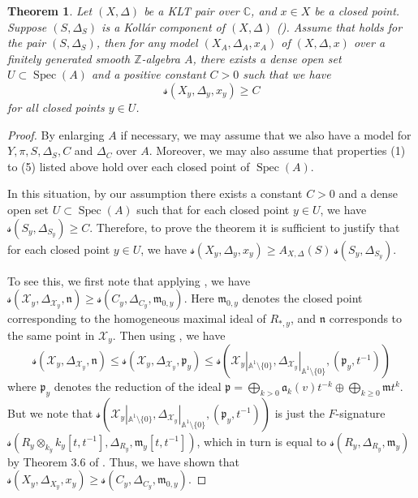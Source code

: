\documentclass[11pt,reqno]{amsart}
\newcommand{\A}{\mathbb{A}}
\newcommand{\C}{\mathbb{C}}
\newcommand{\Z}{\mathbb{Z}}
\newcommand{\cX}{\mathcal{X}}
\newcommand{\fa}{\mathfrak{a}}
\newcommand{\fm}{\mathfrak{m}}
\newcommand{\fn}{\mathfrak{n}}
\DeclareMathOperator{\Spec}{Spec}
\numberwithin{equation}{section}
\newtheorem{thm}[prop] {Theorem}
\theoremstyle{definition}
\newcommand{\s}{\mathscr{s}}
\begin{document}
\begin{thm} \label{thm:localtoglobalreduction}
  Let $(X, \Delta)$ be a KLT pair over $\C$, and $x \in X$ be a closed point. Suppose $(S, \Delta_S)$ is a Koll\'ar component of $(X, \Delta)$ (). Assume that  holds for the pair $(S, \Delta_S)$, then for any model $(X_A, \Delta_A, x_A)$ of $(X, \Delta, x)$ over a finitely generated smooth $\Z$-algebra $A$, there exists a dense open set $U \subset \Spec(A)$ and a positive constant $C>0$ such that we have
  \[ \s(X_y, \Delta_y, x_y) \geq C  \]
  for all closed points $y \in U$.
  \end{thm}
\begin{proof}
        By enlarging $A$ if necessary, we may assume that we also have a model for $Y, \pi, S, \Delta_S, C$ and $\Delta_C$ over $A$. Moreover, we may also assume that properties (1) to (5) listed above hold over each closed point of $\Spec(A).$

        In this situation, by our assumption there exists a constant $C>0$ and a dense open set $U \subset \Spec(A)$ such that for each closed point $y \in U$, we have
        $\s(S_y, \Delta_{S_y}) \geq C$. Therefore, to prove the theorem it is sufficient to justify that for each closed point $y \in U$, we have $\s(X_y,\Delta_y, x_y) \geq  A_{X, \Delta}(S)\ \s(S_y, \Delta_{S_y}) $.

        To see this, we first note that applying \cite[Corollary 1.2]{TaylorAdjunctionforFsig}, we have $\s(\cX_y, \Delta_{\cX_y}, \fn) \geq \s(C_y, \Delta_{C_y}, \fm_{0,y})$. Here $\fm_{0,y}$ denotes the closed point corresponding to the homogeneous maximal ideal of $R_{*, y}$, and $\fn$ corresponds to the same point in $\cX_y$. Then using \cite[Theorem 4.9]{PolstraTuckerCombinedApproach}, we have
        \[ \s(\cX_y, \Delta_{\cX_y}, \fn) \leq \s(\cX_y, \Delta_{\cX_y}, \mathfrak{p}_y) \leq \s(\cX_y|_{\A^1 \setminus \{0\}}, \Delta_{\cX_y}|_{\A^1 \setminus \{0\}}, (\mathfrak{p}_y, t^{-1}))\]
        where $\mathfrak{p}_y$ denotes the reduction of the ideal $\mathfrak{p} = \bigoplus_{k>0} \fa_k (v) t^{-k} \oplus \bigoplus _{k \geq 0} \fm t^{k} $. But we note that $\s(\cX_y|_{\A^1 \setminus \{0\}}, \Delta_{\cX_y}|_{\A^1 \setminus \{0\}}, (\mathfrak{p}_y, t^{-1}))$ is just the $F$-signature $\s(R_y \otimes _{k_y} k_y [t,t^{-1}], \Delta_{R_y}, \fm_{y}[t,t^{-1}]) $, which in turn is equal to $\s(R_y, \Delta_{R_y}, \fm_y)$ by Theorem 3.6 of \cite{CRSTBertiniTheorems}. Thus, we have shown that $\s(X_y, \Delta_{X_y}, x_y) \geq  \s(C_y, \Delta_{C_y}, \fm_{0,y})$.


\end{proof}
\end{document}
